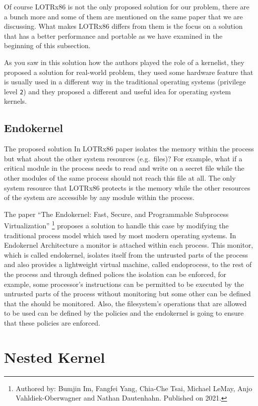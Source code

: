 Of course LOTRx86 is not the only proposed solution for our problem,
there are a bunch more and some of them are mentioned on the same paper
that we are discussing. What makes LOTRx86 differs from them is the
focus on a solution that has a better performance and portable as we
have examined in the beginning of this subsection.

As you saw in this solution how the authors played the role of a
kernelist, they proposed a solution for real-world problem, they used
some hardware feature that is usually used in a different way in the
traditional operating systems (privilege level \lstinline!2!) and they
proposed a different and useful idea for operating system kernels.

\subsection{Endokernel}\label{endokernel}

The proposed solution In LOTRx86 paper isolates the memory within the
process but what about the other system resources (e.g.~files)? For
example, what if a critical module in the process needs to read and
write on a secret file while the other modules of the same process
should not reach this file at all. The only system resource that LOTRx86
protects is the memory while the other resources of the system are
accessible by any module within the process.

The paper ``The Endokernel: Fast, Secure, and Programmable Subprocess
Virtualization'' \footnote{Authored by: Bumjin Im, Fangfei Yang,
  Chia-Che Tsai, Michael LeMay, Anjo Vahldiek-Oberwagner and Nathan
  Dautenhahn. Published on 2021.} proposes a solution to handle this
case by modifying the traditional process model which used by most
modern operating systems. In Endokernel Architecture a monitor is
attached within each process. This monitor, which is called endokernel,
isolates itself from the untrusted parts of the process and also
provides a lightweight virtual machine, called endoprocess, to the rest
of the process and through defined polices the isolation can be
enforced, for example, some processor's instructions can be permitted to
be executed by the untrusted parts of the process without monitoring but
some other can be defined that the should be monitored. Also, the
filesystem's operations that are allowed to be used can be defined by
the policies and the endokernel is going to ensure that these policies
are enforced.

\section{Nested Kernel}\label{nested-kernel}

